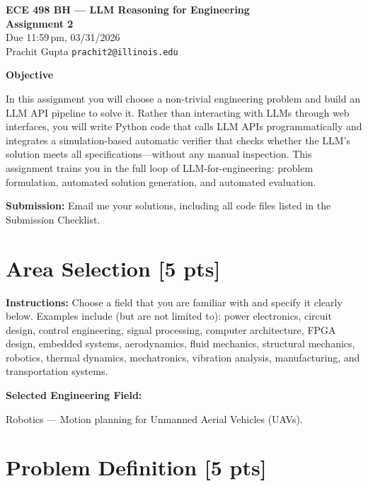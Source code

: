 \documentclass[12pt]{article}
\begin{document}
\begin{center}
  {\LARGE\textbf{ECE 498 BH --- LLM Reasoning for Engineering}}\\[6pt]
  {\large\textbf{Assignment 2}}\\[4pt]
  {\normalsize Due 11:59\,pm, 03/31/2026}\\[10pt]
  {\large Prachit Gupta \quad \texttt{prachit2@illinois.edu}}
\end{center}
\thispagestyle{fancy}

\bigskip
\noindent\textbf{Objective}

\noindent
In this assignment you will choose a non-trivial engineering problem and build an LLM API
pipeline to solve it. Rather than interacting with LLMs through web interfaces, you will write
Python code that calls LLM APIs programmatically and integrates a simulation-based automatic
verifier that checks whether the LLM's solution meets all specifications---without any manual
inspection. This assignment trains you in the full loop of LLM-for-engineering: problem
formulation, automated solution generation, and automated evaluation.

\medskip
\noindent\textbf{Submission:} Email me your solutions, including all code files listed in the
Submission Checklist.

\newpage
\section{Area Selection [5 pts]}

\noindent\textbf{Instructions:} Choose a field that you are familiar with and specify it clearly
below. Examples include (but are not limited to): power electronics, circuit design, control
engineering, signal processing, computer architecture, FPGA design, embedded systems,
aerodynamics, fluid mechanics, structural mechanics, robotics, thermal dynamics, mechatronics,
vibration analysis, manufacturing, and transportation systems.

\bigskip
\noindent\textbf{Selected Engineering Field:}

\medskip
\noindent
Robotics --- Motion planning for Unmanned Aerial Vehicles (UAVs).

\newpage
\section{Problem Definition [5 pts]}
\end{document}
